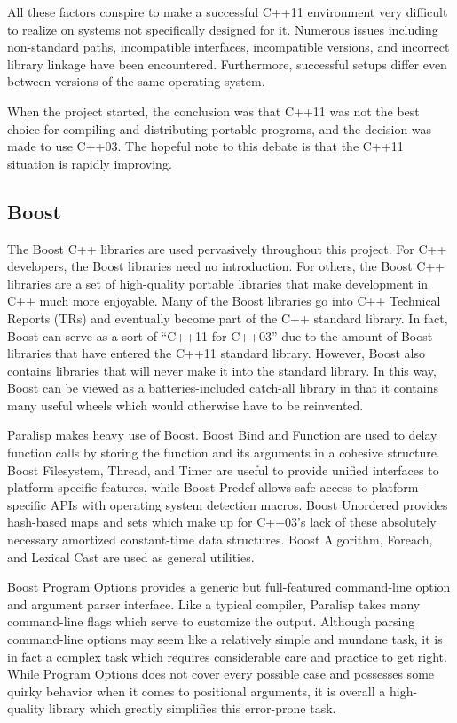 \documentclass[
abstracton,
fontsize=12pt,
]{scrartcl}
\begin{document}
All these factors conspire to make a successful C++11 environment very difficult to realize on systems not specifically designed for it. Numerous issues including non-standard paths, incompatible interfaces, incompatible versions, and incorrect library linkage have been encountered. Furthermore, successful setups differ even between versions of the same operating system.

When the project started, the conclusion was that C++11 was not the best choice for compiling and distributing portable programs, and the decision was made to use C++03. The hopeful note to this debate is that the C++11 situation is rapidly improving.

\subsection{Boost}
\label{sec:boost}

The Boost C++ libraries are used pervasively throughout this project. For C++ developers, the Boost libraries need no introduction. For others, the Boost C++ libraries are a set of high-quality portable libraries that make development in C++ much more enjoyable. Many of the Boost libraries go into C++ Technical Reports (TRs) and eventually become part of the C++ standard library. In fact, Boost can serve as a sort of ``C++11 for C++03'' due to the amount of Boost libraries that have entered the C++11 standard library. However, Boost also contains libraries that will never make it into the standard library. In this way, Boost can be viewed as a batteries-included catch-all library in that it contains many useful wheels which would otherwise have to be reinvented.

Paralisp makes heavy use of Boost. Boost Bind and Function are used to delay function calls by storing the function and its arguments in a cohesive structure. Boost Filesystem, Thread, and Timer are useful to provide unified interfaces to platform-specific features, while Boost Predef allows safe access to platform-specific APIs with operating system detection macros. Boost Unordered provides hash-based maps and sets which make up for C++03's lack of these absolutely necessary amortized constant-time data structures. Boost Algorithm, Foreach, and Lexical Cast are used as general utilities.

Boost Program Options provides a generic but full-featured command-line option and argument parser interface. Like a typical compiler, Paralisp takes many command-line flags which serve to customize the output. Although parsing command-line options may seem like a relatively simple and mundane task, it is in fact a complex task which requires considerable care and practice to get right. While Program Options does not cover every possible case and possesses some quirky behavior when it comes to positional arguments, it is overall a high-quality library which greatly simplifies this error-prone task.
\end{document}
